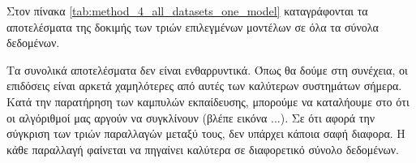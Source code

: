 Στον πίνακα \ref{tab:method_4_all_datasets_one_model} καταγράφονται τα αποτελέσματα της δοκιμής των τριών επιλεγμένων μοντέλων σε όλα τα σύνολα δεδομένων.
\begin{table}[h]
    \begin{center}
    \end{center}
    \caption[]{\label{tab:method_4_all_datasets_one_model}Συνολικά αποτελέσματα δοκιμής των τριών μοντέλων σε όλα τα σύνολα δεδομένων που υποστηρίζει η τέταρτη μέθοδος για 50 εποχές. Στα πειράματα με αστερίσκο (*) παρατηρίσαμε αστάθεια.} 
\end{table}

Τα συνολικά αποτελέσματα δεν είναι ενθαρρυντικά. Όπως θα δούμε στη συνέχεια, οι επιδόσεις είναι αρκετά χαμηλότερες από αυτές των καλύτερων συστημάτων σήμερα. Κατά την παρατήρηση των καμπυλών εκπαίδευσης, μπορούμε να καταλήουμε στο ότι οι αλγόριθμοί μας αργούν να συγκλίνουν (βλέπε εικόνα ...). Σε ότι αφορά την σύγκριση των τριών παραλλαγών μεταξύ τους, δεν υπάρχει κάποια σαφή διαφορα. Η κάθε παραλλαγή φαίνεται να πηγαίνει καλύτερα σε διαφορετικό σύνολο δεδομένων.\par

